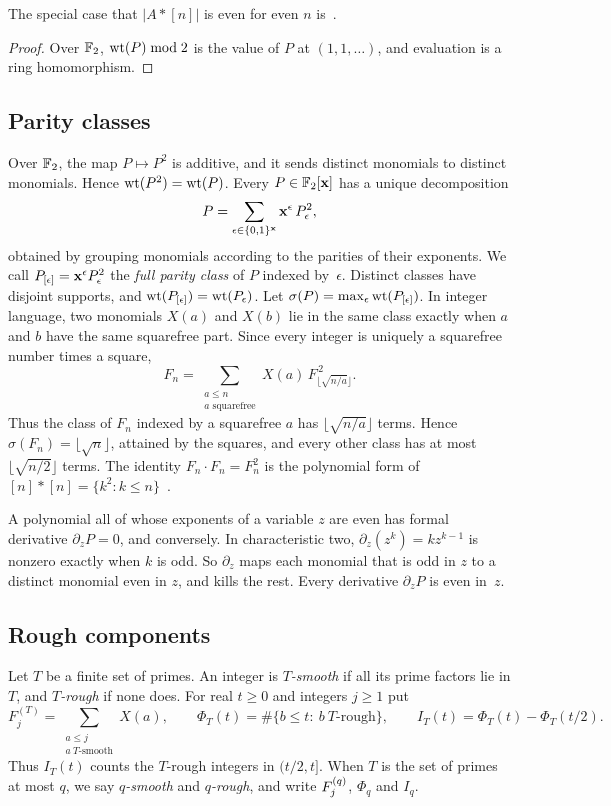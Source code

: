The special case that $|A*[n]|$ is even for even $n$ is~\cite[Lemma~4]{Pilz}.

\begin{proof}
Over $\mathbb{F}_2$, $\operatorname{wt}(P)\bmod2$ is the value of $P$ at $(1,1,\dots)$, and evaluation is a ring homomorphism.
\end{proof}

\subsection{Parity classes}
Over $\mathbb{F}_2$, the map $P\mapsto P^2$ is additive, and it sends distinct monomials to distinct monomials. Hence $\operatorname{wt}(P^2)=\operatorname{wt}(P)$. Every $P\in\mathbb{F}_2[\mathbf{x}]$ has a unique decomposition
\begin{equation}\label{eq:parity}
  P=\sum_{\epsilon\in\{0,1\}^{\mathbf{x}}}\mathbf{x}^\epsilon\,P_\epsilon^2,
\end{equation}
obtained by grouping monomials according to the parities of their exponents. We call $P_{[\epsilon]}=\mathbf{x}^\epsilon P_\epsilon^2$ the \emph{full parity class} of $P$ indexed by~$\epsilon$. Distinct classes have disjoint supports, and $\operatorname{wt}(P_{[\epsilon]})=\operatorname{wt}(P_\epsilon)$. Let $\sigma(P)=\max_\epsilon\operatorname{wt}(P_{[\epsilon]})$. In integer language, two monomials $X(a)$ and $X(b)$ lie in the same class exactly when $a$ and $b$ have the same squarefree part. Since every integer is uniquely a squarefree number times a square,
\begin{equation}\label{eq:squarefree-split}
 F_n=\sum_{\substack{a\le n\\ a\text{ squarefree}}} X(a)\,F_{\lfloor\sqrt{n/a}\rfloor}^{\,2}.
\end{equation}
Thus the class of $F_n$ indexed by a squarefree $a$ has $\lfloor\sqrt{n/a}\rfloor$ terms. Hence $\sigma(F_n)=\lfloor\sqrt n\rfloor$, attained by the squares, and every other class has at most $\lfloor\sqrt{n/2}\rfloor$ terms. The identity $F_n\cdot F_n=F_n^2$ is the polynomial form of $[n]*[n]=\{k^2:k\le n\}$~\cite{KM,HP}.

A polynomial all of whose exponents of a variable $z$ are even has formal derivative $\partial_zP=0$, and conversely. In characteristic two, $\partial_z(z^k)=kz^{k-1}$ is nonzero exactly when $k$ is odd. So $\partial_z$ maps each monomial that is odd in $z$ to a distinct monomial even in $z$, and kills the rest. Every derivative $\partial_zP$ is even in~$z$.

\subsection{Rough components}\label{sec:rough}
Let $T$ be a finite set of primes. An integer is \emph{$T$-smooth} if all its prime factors lie in $T$, and \emph{$T$-rough} if none does. For real $t\ge0$ and integers $j\ge1$ put
\[
 F_j^{(T)}=\sum_{\substack{a\le j\\ a\ T\text{-smooth}}}X(a),\qquad
 \Phi_T(t)=\#\{b\le t:\ b\ T\text{-rough}\},\qquad
 I_T(t)=\Phi_T(t)-\Phi_T(t/2).
\]
Thus $I_T(t)$ counts the $T$-rough integers in $(t/2,t]$. When $T$ is the set of primes at most $q$, we say \emph{$q$-smooth} and \emph{$q$-rough}, and write $F_{j}^{(q)}$, $\Phi_q$ and $I_q$.

